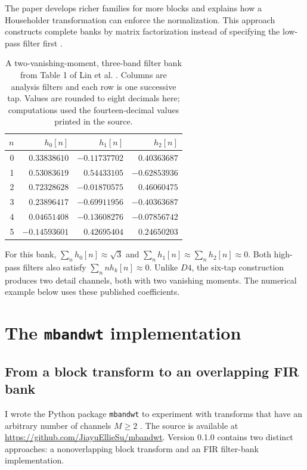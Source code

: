 \documentclass{article}
\theoremstyle{definition}
\theoremstyle{remark}
\newcommand{\code}[1]{\texttt{#1}}
\begin{document}
The paper develops richer families for more blocks and explains how a Householder transformation can enforce the normalization. This approach constructs complete banks by matrix factorization instead of specifying the low-pass filter first \cite{lin2006}.

\begin{table}[htbp]
\centering\small
\caption{A two-vanishing-moment, three-band filter bank from Table 1 of Lin et al. \cite{lin2006}. Columns are analysis filters and each row is one successive tap. Values are rounded to eight decimals here; computations used the fourteen-decimal values printed in the source.}
\label{tab:linfilters}
\begin{tabular}{rrrr}
\toprule
$n$ & $h_0[n]$ & $h_1[n]$ & $h_2[n]$\\\midrule
0 & $ 0.33838610$ & $-0.11737702$ & $ 0.40363687$\\
1 & $ 0.53083619$ & $ 0.54433105$ & $-0.62853936$\\
2 & $ 0.72328628$ & $-0.01870575$ & $ 0.46060475$\\
3 & $ 0.23896417$ & $-0.69911956$ & $-0.40363687$\\
4 & $ 0.04651408$ & $-0.13608276$ & $-0.07856742$\\
5 & $-0.14593601$ & $ 0.42695404$ & $ 0.24650203$\\\bottomrule
\end{tabular}
\end{table}

For this bank, $\sum_n h_0[n]\approx\sqrt3$ and $\sum_n h_1[n]\approx\sum_n h_2[n]\approx0$. Both high-pass filters also satisfy $\sum_n n h_k[n]\approx0$. Unlike $D4$, the six-tap construction produces two detail channels, both with two vanishing moments. The numerical example below uses these published coefficients.

\section{The \texorpdfstring{\texttt{mbandwt}}{mbandwt} implementation}
\subsection{From a block transform to an overlapping FIR bank}
I wrote the Python package \code{mbandwt} to experiment with transforms that have an arbitrary number of channels $M\ge2$ \cite{su2026}. The source is available at \url{https://github.com/JiayuEllieSu/mbandwt}. Version 0.1.0 contains two distinct approaches: a nonoverlapping block transform and an FIR filter-bank implementation.
\end{document}

